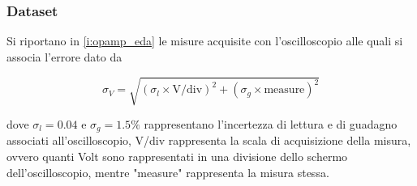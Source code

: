 \documentclass[a4paper,11pt]{article} %
\begin{document}
\subsubsection{Dataset}
Si riportano in  \autoref{i:opamp_eda} le misure acquisite con l'oscilloscopio alle quali si associa l'errore dato da

\begin{equation}\label{e:osc}
	\sigma_{V} = \sqrt{ (\sigma_{l}\times\text{V/div})^2 + (\sigma_{g}\times\text{measure})^2 }
\end{equation}

\noindent dove $\sigma_{l}=0.04$ e $\sigma_{g}=1.5\%$ rappresentano l'incertezza di lettura e di guadagno associati
all'oscilloscopio, V/div rappresenta la scala di acquisizione della misura, ovvero quanti Volt sono rappresentati in una
divisione dello schermo dell'oscilloscopio, mentre "measure" rappresenta la misura stessa.
\end{document}
